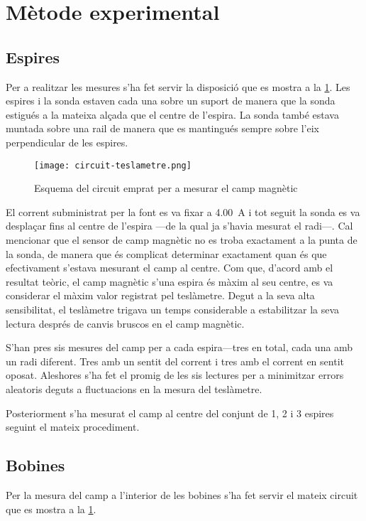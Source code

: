 \section{Mètode experimental}
\subsection{Espires}
Per a realitzar les mesures s'ha fet servir la disposició que es mostra a la \cref{fig:circuit teslametre}. Les espires i la sonda estaven cada una sobre un suport de manera que la sonda estigués a la mateixa alçada que el centre de l'espira. La sonda també estava muntada sobre una rail de manera que es mantingués sempre sobre l'eix perpendicular de les espires.

\begin{figure}[htb]
  \centering \small \sffamily
  \texttt{[image: circuit-teslametre.png]}
  \caption{Esquema del circuit emprat per a mesurar el camp magnètic}
  \label{fig:circuit teslametre}
\end{figure}

El corrent subministrat per la font es va fixar a \SI{4.00}{A} i tot seguit la sonda es va desplaçar fins al centre de l'espira ---de la qual ja s'havia mesurat el radi---. Cal mencionar que el sensor de camp magnètic no es troba exactament a la punta de la sonda, de manera que és complicat determinar exactament quan és que efectivament s'estava mesurant el camp al centre. Com que, d'acord amb el resultat teòric, el camp magnètic s'una espira és màxim al seu centre, es va considerar el màxim valor registrat pel teslàmetre. Degut a la seva alta sensibilitat, el teslàmetre trigava un temps considerable a estabilitzar la seva lectura després de canvis bruscos en el camp magnètic. 

S'han pres sis mesures del camp per a cada espira---tres en total, cada una amb un radi diferent. Tres amb un sentit del corrent i tres amb el corrent en sentit oposat. Aleshores s'ha fet el promig de les sis lectures per a minimitzar errors aleatoris deguts a fluctuacions en la mesura del teslàmetre.   

Posteriorment s'ha mesurat el camp al centre del conjunt de 1, 2 i 3 espires seguint el mateix procediment.

\subsection{Bobines}
Per la mesura del camp a l'interior de les bobines s'ha fet servir el mateix circuit que es mostra a la \cref{fig:circuit teslametre}.

